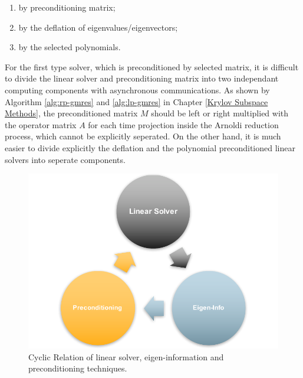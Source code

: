 \begin{enumerate}
	\item by preconditioning matrix;
	\item by the deflation of eigenvalues/eigenvectors;
	\item by the selected polynomials.
\end{enumerate}

For the first type solver, which is preconditioned by selected matrix, it is difficult to divide the linear solver and preconditioning matrix into two independant computing components with asynchronous communications. As shown by Algorithm \ref{alg:rp-gmres} and \ref{alg:lp-gmres} in Chapter \ref{Krylov Subspace Methods}, the preconditioned matrix $M$ should be left or right multiplied with the operator matrix $A$ for each time projection inside the Arnoldi reduction process, which cannot be explicitly seperated. On the other hand, it is much easier to divide explicitly the deflation and the polynomial preconditioned linear solvers into seperate components. 

\begin{figure}[htbp]
	\centering
	\includegraphics[width=5.2in]{fig/cyclic.pdf}
	\caption{Cyclic Relation of linear solver, eigen-information and preconditioning techniques.}
	\label{fig:cyclic}
\end{figure}

